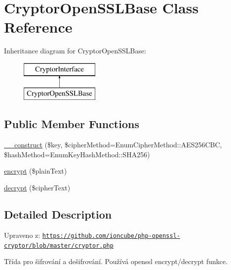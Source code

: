 \hypertarget{class_pes_1_1_security_1_1_cryptor_1_1_cryptor_open_s_s_l_base}{}\section{Cryptor\+Open\+S\+S\+L\+Base Class Reference}
\label{class_pes_1_1_security_1_1_cryptor_1_1_cryptor_open_s_s_l_base}
Inheritance diagram for Cryptor\+Open\+S\+S\+L\+Base\+:\begin{figure}[H]
\begin{center}
\leavevmode
\includegraphics[height=2.000000cm]{class_pes_1_1_security_1_1_cryptor_1_1_cryptor_open_s_s_l_base}
\end{center}
\end{figure}
\subsection*{Public Member Functions}
\begin{DoxyCompactItemize}
\item 
\mbox{\hyperlink{class_pes_1_1_security_1_1_cryptor_1_1_cryptor_open_s_s_l_base_a77c2a2122cb5b976d6e40c704ea4b3b4}{\+\_\+\+\_\+construct}} (\$key, \$cipher\+Method=Enum\+Cipher\+Method\+::\+A\+E\+S256\+C\+BC, \$hash\+Method=Enum\+Key\+Hash\+Method\+::\+S\+H\+A256)
\item 
\mbox{\hyperlink{class_pes_1_1_security_1_1_cryptor_1_1_cryptor_open_s_s_l_base_a1dd4de135736b6fb90d21c7f6f354909}{encrypt}} (\$plain\+Text)
\item 
\mbox{\hyperlink{class_pes_1_1_security_1_1_cryptor_1_1_cryptor_open_s_s_l_base_a0d70e063189372896e31676e372c7eab}{decrypt}} (\$cipher\+Text)
\end{DoxyCompactItemize}


\subsection{Detailed Description}
Upraveno z\+: \href{https://github.com/ioncube/php-openssl-cryptor/blob/master/cryptor.php}{\tt https\+://github.\+com/ioncube/php-\/openssl-\/cryptor/blob/master/cryptor.\+php}

Třída pro šifrování a dešifrování. Používá openssl encrypt/decrypt funkce.

